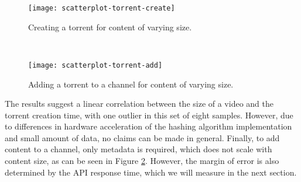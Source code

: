 \begin{minipage}{.49\textwidth}
\begin{figure}[H]
	\centering %
	\texttt{[image: scatterplot-torrent-create]}
	\caption{Creating a torrent for content of varying size.}
	\label{fig:scatterplot-torrent-create}
\end{figure}
\end{minipage}
~
\begin{minipage}{.49\textwidth}
\begin{figure}[H]
	\centering %
	\texttt{[image: scatterplot-torrent-add]}
	\caption{Adding a torrent to a channel for content of varying size.}
	\label{fig:scatterplot-torrent-add}
\end{figure}
\end{minipage}

The results suggest a linear correlation between the size of a video and the torrent creation time, with one outlier in this set of eight samples.
However, due to differences in hardware acceleration of the hashing algorithm implementation and small amount of data, no claims can be made in general.
Finally, to add content to a channel, only metadata is required, which does not scale with content size, as can be seen in Figure \ref{fig:scatterplot-torrent-add}.
However, the margin of error is also determined by the API response time, which we will measure in the next section.


